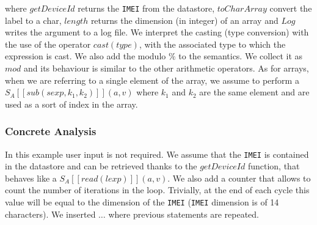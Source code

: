 \documentclass{llncs}
\begin{document}
\noindent where $getDeviceId$ returns the \texttt{IMEI} from the datastore, $toCharArray$ convert the label to a char, $length$ returns the dimension (in integer) of an array and $Log$ writes the argument to a log file. We interpret the casting (type conversion) with the use of the operator $cast(type)$, with the associated type to which the expression is cast. We also add the modulo $\%$ to the semantics. We collect it as $mod$ and its behaviour is similar to the other arithmetic operators. As for arrays, when we are referring to a single element of the array, we assume to perform a $S_A [\![ sub(sexp, k_1, k_2) ]\!](a, v)$ where $k_1$ and $k_2$ are the same element and are used as a sort of index in the array.

\subsubsection{Concrete Analysis}
In this example user input is not required. We assume that the \texttt{IMEI} is contained in the datastore and can be retrieved thanks to the $getDeviceId$ function, that behaves like a $S_A [\![read(lexp)]\!](a, v)$. We also add a counter that allows to count the number of iterations in the loop. Trivially, at the end of each cycle this value will be equal to the dimension of the \texttt{IMEI} (\texttt{IMEI} dimension is of 14 characters). We inserted $\ldots$ where previous statements are repeated.
\end{document}
